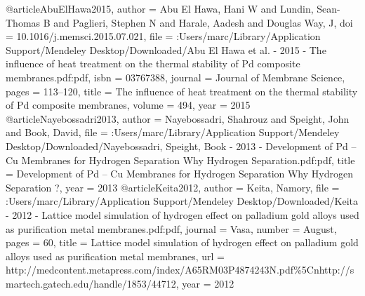 @article{AbuElHawa2015,
author = {{Abu El Hawa}, Hani W and Lundin, Sean-Thomas B and Paglieri, Stephen N and Harale, Aadesh and {Douglas Way}, J},
doi = {10.1016/j.memsci.2015.07.021},
file = {:Users/marc/Library/Application Support/Mendeley Desktop/Downloaded/Abu El Hawa et al. - 2015 - The influence of heat treatment on the thermal stability of Pd composite membranes.pdf:pdf},
isbn = {03767388},
journal = {Journal of Membrane Science},
pages = {113--120},
title = {{The influence of heat treatment on the thermal stability of Pd composite membranes}},
volume = {494},
year = {2015}
}
@article{Nayebossadri2013,
author = {Nayebossadri, Shahrouz and Speight, John and Book, David},
file = {:Users/marc/Library/Application Support/Mendeley Desktop/Downloaded/Nayebossadri, Speight, Book - 2013 - Development of Pd – Cu Membranes for Hydrogen Separation Why Hydrogen Separation.pdf:pdf},
title = {{Development of Pd – Cu Membranes for Hydrogen Separation Why Hydrogen Separation ?}},
year = {2013}
}
@article{Keita2012,
author = {Keita, Namory},
file = {:Users/marc/Library/Application Support/Mendeley Desktop/Downloaded/Keita - 2012 - Lattice model simulation of hydrogen effect on palladium gold alloys used as purification metal membranes.pdf:pdf},
journal = {Vasa},
number = {August},
pages = {60},
title = {{Lattice model simulation of hydrogen effect on palladium gold alloys used as purification metal membranes}},
url = {http://medcontent.metapress.com/index/A65RM03P4874243N.pdf{\%}5Cnhttp://smartech.gatech.edu/handle/1853/44712},
year = {2012}
}
